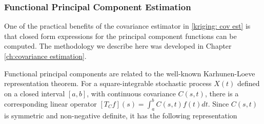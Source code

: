 


\subsubsection{Functional Principal Component Estimation} %
\label{sub:FPC estimation}

One of the practical benefits of the covariance estimator in \eqref{kriging: cov est} is that closed form expressions for the principal component functions can be computed. The methodology we describe here was developed in Chapter \ref{ch:covariance estimation}.

Functional principal components are related to the well-known Karhunen-Loeve representation theorem. For a square-integrable stochastic process $X(t)$ defined on a closed interval $[a,b]$, with continuous covariance $C(s,t)$, there is a corresponding linear operator $[T_Cf](s) = \int_a^bC(s,t)f(t)dt$. Since $C(s,t)$ is symmetric and non-negative definite, it has the following representation 

